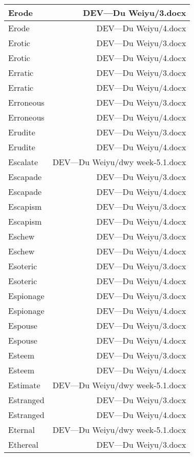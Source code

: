 \documentclass{article}
\begin{document}
\begin{center}
\begin{longtable}{|l|r|}
\hline
Erode  &  DEV---Du Weiyu/3.docx\\  
\hline
Erode  &  DEV---Du Weiyu/4.docx\\  
\hline
Erotic  &  DEV---Du Weiyu/3.docx\\  
\hline
Erotic  &  DEV---Du Weiyu/4.docx\\  
\hline
Erratic  &  DEV---Du Weiyu/3.docx\\  
\hline
Erratic  &  DEV---Du Weiyu/4.docx\\  
\hline
Erroneous  &  DEV---Du Weiyu/3.docx\\  
\hline
Erroneous  &  DEV---Du Weiyu/4.docx\\  
\hline
Erudite  &  DEV---Du Weiyu/3.docx\\  
\hline
Erudite  &  DEV---Du Weiyu/4.docx\\  
\hline
Escalate  &  DEV---Du Weiyu/dwy week-5.1.docx\\  
\hline
Escapade  &  DEV---Du Weiyu/3.docx\\  
\hline
Escapade  &  DEV---Du Weiyu/4.docx\\  
\hline
Escapism  &  DEV---Du Weiyu/3.docx\\  
\hline
Escapism  &  DEV---Du Weiyu/4.docx\\  
\hline
Eschew  &  DEV---Du Weiyu/3.docx\\  
\hline
Eschew  &  DEV---Du Weiyu/4.docx\\  
\hline
Esoteric  &  DEV---Du Weiyu/3.docx\\  
\hline
Esoteric  &  DEV---Du Weiyu/4.docx\\  
\hline
Espionage  &  DEV---Du Weiyu/3.docx\\  
\hline
Espionage  &  DEV---Du Weiyu/4.docx\\  
\hline
Espouse  &  DEV---Du Weiyu/3.docx\\  
\hline
Espouse  &  DEV---Du Weiyu/4.docx\\  
\hline
Esteem  &  DEV---Du Weiyu/3.docx\\  
\hline
Esteem  &  DEV---Du Weiyu/4.docx\\  
\hline
Estimate  &  DEV---Du Weiyu/dwy week-5.1.docx\\  
\hline
Estranged  &  DEV---Du Weiyu/3.docx\\  
\hline
Estranged  &  DEV---Du Weiyu/4.docx\\  
\hline
Eternal  &  DEV---Du Weiyu/dwy week-5.1.docx\\  
\hline
Ethereal  &  DEV---Du Weiyu/3.docx\\  
\hline

\end{longtable}
\end{center}
\end{document}
